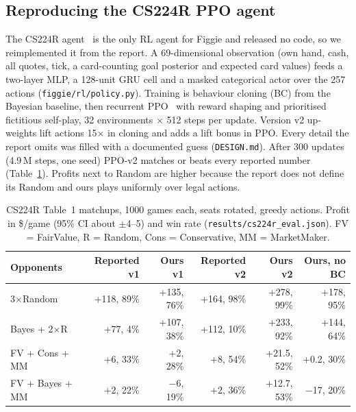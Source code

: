 \documentclass{article}
\newcommand{\file}[1]{{\small\texttt{#1}}}
\begin{document}
\subsection{Reproducing the CS224R PPO agent}
The CS224R agent~\cite{cs224r} is the only RL agent for Figgie and released no code, so we reimplemented it from the report.
A 69-dimensional observation (own hand, cash, all quotes, tick, a card-counting goal posterior and expected card values) feeds a two-layer MLP, a 128-unit GRU cell and a masked categorical actor over the 257 actions (\file{figgie/rl/policy.py}).
Training is behaviour cloning (BC) from the Bayesian baseline, then recurrent PPO~\cite{ppo} with reward shaping and prioritised fictitious self-play, 32 environments $\times$ 512 steps per update.
Version v2 up-weights lift actions 15$\times$ in cloning and adds a lift bonus in PPO. Every detail the report omits was filled with a documented guess (\file{DESIGN.md}).
After 300 updates (4.9\,M steps, one seed) PPO-v2 matches or beats every reported number (Table~\ref{tab:cs224r}). Profits next to Random are higher because the report does not define its Random and ours plays uniformly over legal actions.

\begin{table}[h]
  \centering\small
  \caption{CS224R Table~1 matchups, 1000 games each, seats rotated, greedy actions. Profit in \$/game (95\% CI about $\pm$4--5) and win rate (\file{results/cs224r\_eval.json}). FV = FairValue, R = Random, Cons = Conservative, MM = MarketMaker.}
  \label{tab:cs224r}
  \begin{tabular}{@{}lrrrrr@{}}
    \toprule
    Opponents & Reported v1 & Ours v1 & Reported v2 & Ours v2 & Ours, no BC \\
    \midrule
    3$\times$Random & +118, 89\% & +135, 76\% & +164, 98\% & +278, 99\% & +178, 95\% \\
    Bayes + 2$\times$R & +77, 4\% & +107, 38\% & +112, 10\% & +233, 92\% & +144, 64\% \\
    FV + Cons + MM & +6, 33\% & +2, 28\% & +8, 54\% & +21.5, 52\% & +0.2, 30\% \\
    FV + Bayes + MM & +2, 22\% & $-$6, 19\% & +2, 36\% & +12.7, 53\% & $-$17, 20\% \\
    \bottomrule
  \end{tabular}
\end{table}
\end{document}
